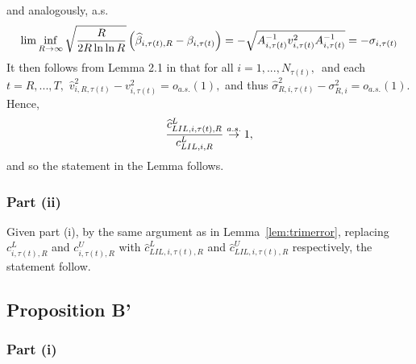 and analogously, a.s.%
\begin{equation*}
\lim \inf_{R\rightarrow \infty }\sqrt{\frac{R}{2R\ln \ln R}}\left( \widehat{%
\beta }_{i,\tau(t),R}-\beta _{i,\tau(t)}\right) =-\sqrt{A_{i,\tau(t)}^{-1}v_{i,\tau(t)}^{2}A_{i,\tau(t)}^{-1}}=-\sigma _{i,\tau(t)}
\end{equation*}
It then follows from Lemma 2.1 in \cite{corradi1999deciding} that for all $%
i=1,...,N_{\tau(t)},$\ and each $t=R,...,T,$ $%
\widehat{v}_{i,R,\tau(t)}^{2}-v_{i,\tau(t)}^{2}=o_{a.s.}(1),$ and thus $\widehat{\sigma }%
_{R,i,\tau(t)}^{2}-\sigma _{R,i}^{2}=o_{a.s.}(1).$
Hence,%
\begin{equation*}
\frac{\widehat{c}_{LIL,i,\tau(t),R}^{L}}{%
c_{LIL,i,R}^{L}}\overset{a.s.}{\rightarrow }1,
\end{equation*}%
and so the statement in the Lemma follows.

\subsubsection{Part (ii)}

Given part (i), by the same argument as in Lemma~\ref{lem:trimerror}, replacing $%
c_{i,\tau(t),R}^{L}$ and $c_{i,\tau(t),R}^{U} $ with $\widehat{c}_{LIL,i,\tau(t),R}^{L}$
and $\widehat{c}_{LIL,i,\tau(t),R}^{U}$
respectively, the statement follow.\medskip


\subsection{Proposition B'}

\subsubsection{Part (i)}

